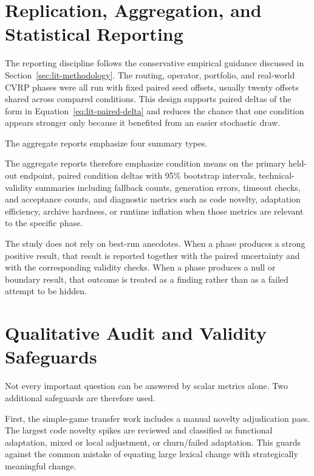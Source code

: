 \section{Replication, Aggregation, and Statistical Reporting}
\label{sec:methods-reporting}

The reporting discipline follows the conservative empirical guidance discussed in
Section~\ref{sec:lit-methodology}. The routing, operator, portfolio, and real-world CVRP phases
were all run with fixed paired seed offsets, usually twenty offsets shared across compared
conditions. This design supports paired deltas of the form in Equation~\eqref{eq:lit-paired-delta}
and reduces the chance that one condition appears stronger only because it benefited from an easier
stochastic draw.

The aggregate reports emphasize four summary types.

The aggregate reports therefore emphasize condition means on the primary held-out endpoint, paired
condition deltas with 95\% bootstrap intervals, technical-validity summaries including fallback
counts, generation errors, timeout checks, and acceptance counts, and diagnostic metrics such as
code novelty, adaptation efficiency, archive hardness, or runtime inflation when those metrics are
relevant to the specific phase.

The study does not rely on best-run anecdotes. When a phase produces a strong positive
result, that result is reported together with the paired uncertainty and with the corresponding
validity checks. When a phase produces a null or boundary result, that outcome is treated as a
finding rather than as a failed attempt to be hidden.

\section{Qualitative Audit and Validity Safeguards}
\label{sec:methods-validity}

Not every important question can be answered by scalar metrics alone. Two additional safeguards are
therefore used.

First, the simple-game transfer work includes a manual novelty adjudication pass. The largest code
novelty spikes are reviewed and classified as functional adaptation, mixed or local adjustment, or
churn/failed adaptation. This guards against the common mistake of equating large lexical change
with strategically meaningful change.

